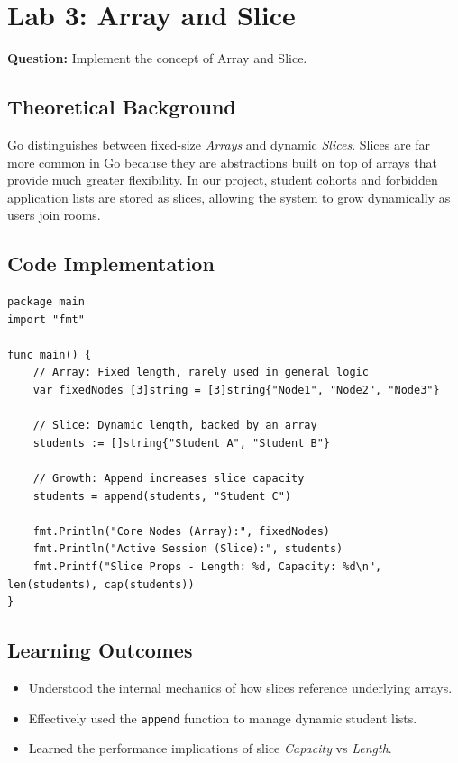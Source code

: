 \documentclass[12pt,a4paper]{article}
\begin{document}
\newpage
\section{Lab 3: Array and Slice}
\textbf{Question:} Implement the concept of Array and Slice.

\subsection{Theoretical Background}
Go distinguishes between fixed-size \textit{Arrays} and dynamic \textit{Slices}. Slices are far more common in Go because they are abstractions built on top of arrays that provide much greater flexibility. In our project, student cohorts and forbidden application lists are stored as slices, allowing the system to grow dynamically as users join rooms.

\subsection{Code Implementation}
\begin{lstlisting}
package main
import "fmt"

func main() {
    // Array: Fixed length, rarely used in general logic
    var fixedNodes [3]string = [3]string{"Node1", "Node2", "Node3"}

    // Slice: Dynamic length, backed by an array
    students := []string{"Student A", "Student B"}
    
    // Growth: Append increases slice capacity
    students = append(students, "Student C")

    fmt.Println("Core Nodes (Array):", fixedNodes)
    fmt.Println("Active Session (Slice):", students)
    fmt.Printf("Slice Props - Length: %d, Capacity: %d\n", len(students), cap(students))
}
\end{lstlisting}

\subsection{Learning Outcomes}
\begin{itemize}
    \item Understood the internal mechanics of how slices reference underlying arrays.
    \item Effectively used the \texttt{append} function to manage dynamic student lists.
    \item Learned the performance implications of slice \textit{Capacity} vs \textit{Length}.
\end{itemize}
\end{document}
